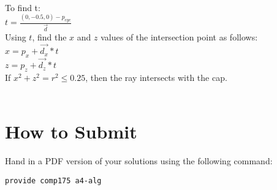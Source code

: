 \documentclass[10pt,twocolumn]{article}
\begin{document}
\begin{framed}
 \\
To find t:\\
$t = \frac{(0,-0.5,0) - p_{eye}}{\vec{d}}$\\
Using $t$, find the $x$ and $z$ values of the intersection point as follows:\\
$x = p_x + \vec{d_x} *t$\\
$z = p_z + \vec{d_z} *t$\\
If $x^2 + z^2 = r^2 \leq 0.25$, then the ray intersects with the cap.\\\\


\end{framed}

\section{How to Submit}

Hand in a PDF version of your solutions using the following command:
\begin{center}
 {\tt provide comp175 a4-alg}
\end{center}


\end{document}
